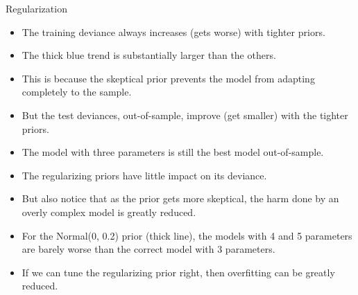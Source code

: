 \documentclass[handout]{beamer}
\begin{document}
\begin{frame}{Regularization}
\scriptsize{


\begin{itemize}

\item The training deviance always increases (gets worse) with tighter priors. 
\item The thick blue trend is substantially larger than the others.

\item This is because the skeptical prior prevents the model from adapting completely to the sample. 
\item But the test deviances, out-of-sample, improve (get smaller) with the tighter priors. 
\item The model with three parameters is still the best model out-of-sample.
\item The regularizing priors have little impact on its deviance.

\item But also notice that as the prior gets more skeptical, the harm done by an overly complex model is greatly reduced.
\item For the Normal(0, 0.2) prior (thick line), the models with 4 and 5 parameters are barely worse than the correct model with 3 parameters. 
\item If we can tune the
regularizing prior right, then overfitting can be greatly reduced.


\end{itemize}


} 
\end{frame}
\end{document}
